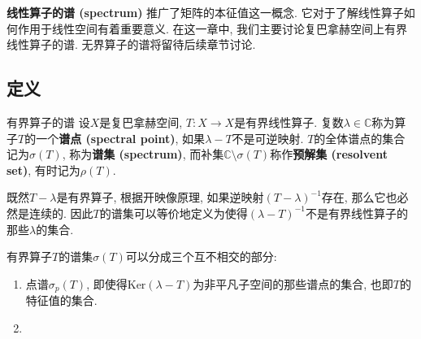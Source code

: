 \textbf{线性算子的谱 (spectrum)} 推广了矩阵的本征值这一概念. 它对于了解线性算子如何作用于线性空间有着重要意义. 在这一章中, 我们主要讨论复巴拿赫空间上有界线性算子的谱. 无界算子的谱将留待后续章节讨论.

\subsection{定义}
\begin{definition}{有界算子的谱}
设$X$是复巴拿赫空间, $T:X\to X$是有界线性算子. 复数$\lambda\in\mathbb{C}$称为算子$T$的一个\textbf{谱点 (spectral point)}, 如果$\lambda-T$不是可逆映射. $T$的全体谱点的集合记为$\sigma(T)$, 称为\textbf{谱集 (spectrum)}, 而补集$\mathbb{C}\setminus\sigma(T)$称作\textbf{预解集 (resolvent set)}, 有时记为$\rho(T)$.
\end{definition}

既然$T-\lambda$是有界算子, 根据开映像原理, 如果逆映射$(T-\lambda)^{-1}$存在, 那么它也必然是连续的. 因此$T$的谱集可以等价地定义为使得$(\lambda-T)^{-1}$不是有界线性算子的那些$\lambda$的集合.

有界算子$T$的谱集$\sigma(T)$可以分成三个互不相交的部分:

\begin{enumerate}
\item 点谱$\sigma_p(T)$, 即使得$\text{Ker}(\lambda-T)$为非平凡子空间的那些谱点的集合, 也即$T$的特征值的集合.

\item 
\end{enumerate}